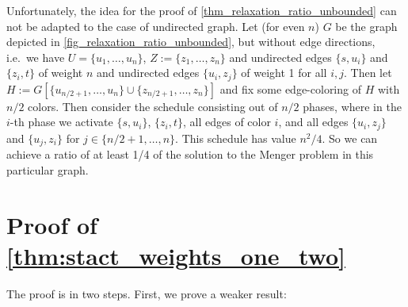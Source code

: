 \documentclass[runningheads]{llncs}
\numberwithin{equation}{section}
\newcommand{\set}[1]{\{ #1 \}}
\newcommand{\fromto}[2]{\set{#1, \ldots, #2}}
\DeclareMathOperator{\opt}{OPT}
\newcommand{\optDirAct}{\opt_\text{dir-ACT}}
\newcommand{\optDirSTP}{\opt_\text{dir-STP}}
\begin{document}

Unfortunately, the idea for the proof of \cref{thm_relaxation_ratio_unbounded} can not be adapted to the case of undirected graph. Let (for even $n$) $G$ be the graph depicted in \cref{fig_relaxation_ratio_unbounded}, but without edge directions, i.e.\ we have $U = \fromto{u_1}{u_n}$, $Z := \fromto{z_1}{z_n}$ and undirected edges $\set{s, u_i}$ and $\set{z_i,t}$ of weight $n$ and undirected edges $\set{u_i, z_j}$ of weight 1 for all $i, j$. Then let $H := G[\fromto{u_{n/2+1}}{u_n} \cup \fromto{z_{n/2+1}}{z_n}]$ and fix some edge-coloring of $H$ with $n/2$ colors. Then consider the schedule consisting out of $n/2$ phases, where in the $i$-th phase we activate $\set{s,u_i}$, $\set{z_i,t}$, all edges of color $i$, and all edges $\set{u_i,z_j}$ and $\set{u_j,z_i}$ for $j \in \fromto{n/2+1}{n}$. This schedule has value $n^2/4$. So we can achieve a ratio of at least 1/4 of the solution to the Menger problem in this particular graph.

\appendix

\section{Proof of \cref{thm:stact_weights_one_two}}
\label{appendix:proof_stact_one_two}

The proof is in two steps. First, we prove a weaker result:
\end{document}
